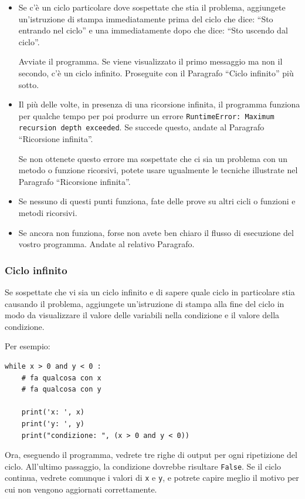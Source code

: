 \documentclass[10pt]{book}
\begin{document}
\begin{itemize}

\item Se c'è un ciclo particolare dove sospettate che stia il problema, aggiungete un'istruzione di stampa immediatamente prima del ciclo che dice:
``Sto entrando nel ciclo'' e una immediatamente dopo che dice:
``Sto uscendo dal ciclo''.

Avviate il programma. Se viene visualizzato il primo messaggio ma non il secondo, c'è un ciclo infinito. Proseguite con il Paragrafo ``Ciclo infinito'' più sotto.

\item Il più delle volte, in presenza di una ricorsione infinita, il programma funziona per qualche tempo per poi produrre un errore {\tt RuntimeError: Maximum
recursion depth exceeded}.  Se succede questo, andate al Paragrafo
``Ricorsione infinita''.

Se non ottenete questo errore ma sospettate che ci sia un problema con un metodo o funzione ricorsivi, potete usare ugualmente le tecniche illustrate nel Paragrafo ``Ricorsione infinita''.

\item Se nessuno di questi punti funziona, fate delle prove su altri cicli o funzioni e metodi ricorsivi.

\item Se ancora non funziona, forse non avete ben chiaro il flusso di esecuzione del vostro programma. Andate al relativo Paragrafo.

\end{itemize}


\subsubsection{Ciclo infinito}

Se sospettate che vi sia un ciclo infinito e di sapere quale ciclo in particolare stia causando il problema, aggiungete un'istruzione di stampa alla fine del ciclo in modo da visualizzare il valore delle variabili nella condizione e il valore della condizione.

Per esempio:

\begin{verbatim}
while x > 0 and y < 0 :
    # fa qualcosa con x
    # fa qualcosa con y

    print('x: ', x)
    print('y: ', y)
    print("condizione: ", (x > 0 and y < 0))
\end{verbatim}
%
Ora, eseguendo il programma, vedrete tre righe di output per ogni ripetizione del ciclo. All'ultimo passaggio, la condizione dovrebbe risultare {\tt False}.  Se il ciclo continua, vedrete comunque i valori di {\tt x} e {\tt y}, e potrete capire meglio il motivo per cui non vengono aggiornati correttamente.
\end{document}
